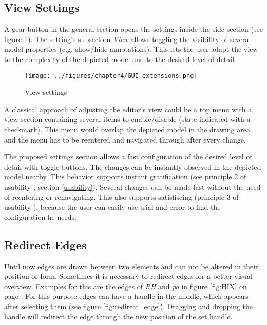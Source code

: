 \documentclass[twoside, openright, 12pt]{book}
\begin{document}
\subsection{View Settings}
\label{editor_extension_settings}
A gear button in the general section opens the settings inside the side section (see figure \ref{fig:GUI_extensions}).
The setting's subsection \textit{View} allows toggling the visibility of several model properties (e.g. show/hide annotations).
This lets the user adapt the view to the complexity of the depicted model and to the desired level of detail.

\begin{figure}[htb]
	\centering
	\texttt{[image: ../figures/chapter4/GUI\_extensions.png]}
	\caption{View settings}
	\label{fig:GUI_extensions}
\end{figure}

\noindent
A classical approach of adjusting the editor's view could be a top menu with a view section containing several items to enable/disable (state indicated with a checkmark).
This menu would overlap the depicted model in the drawing area and the menu has to be reentered and navigated through after every change.

The proposed settings section allows a fast configuration of the desired level of detail with toggle buttons.
The changes can be instantly observed in the depicted model nearby.
This behavior supports instant gratification (see principle 2 of usability \citep{Tidwell11}, section \ref{usability}).
Several changes can be made fast without the need of reentering or renavigating.
This also supports satisfiscing (principle 3 of usability \citep{Tidwell11}), because the user can easily use trial-and-error to find the configuration he needs.


\subsection{Redirect Edges}
\label{editor_extension_redirect_edges}
Until now edges are drawn between two elements and can not be altered in their position or form.
Sometimes it is necessary to redirect edges for a better visual overview.
Examples for this are the edges of \textit{RH} and \textit{pa} in figure \ref{fig:HIX} on page \pageref{fig:HIX}.
For this purpose edges can have a handle in the middle, which appears after selecting them (see figure \ref{fig:redirect_edge}).
Dragging and dropping the handle will redirect the edge through the new position of the set handle.
\end{document}
